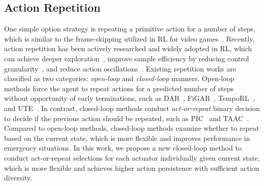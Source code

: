 \subsection{Action Repetition}
One simple option strategy is repeating a primitive action for a number of steps, which is similar to the frame-skipping utilized in RL for video games~\citep{bellemare2013arcade,braylan2015frame}.
Recently, action repetition has been actively researched and widely adopted in RL, which can achieve deeper exploration~\citep{dabney2021temporallyextended}, improve sample efficiency by reducing control granularity~\citep{biedenkapp2021temporl}, and reduce action oscillations~\citep{chen2021addressing}.
Existing repetition works are classified as two categories: \emph{open-loop} and \emph{closed-loop} manners.
Open-loop methods force the agent to repeat actions for a predicted number of steps without opportunity of early terminations, such as DAR~\citep{lakshminarayanan2017dynamic}, FiGAR~\citep{sharma2017learning}, TempoRL~\citep{biedenkapp2021temporl}, and UTE~\citep{lee2024learning}.
In contrast, closed-loop methods conduct \emph{act-or-repeat} binary decision to decide if the previous action should be repeated, such as PIC~\citep{chen2021addressing} and TAAC~\citep{yu2021taac}.
Compared to open-loop methods, closed-loop methods examine whether to repeat based on the current state, which is more flexible and improves performance in emergency situations.
In this work, we propose a new closed-loop method to conduct act-or-repeat selections for each actuator individually given current state, which is more flexible and achieves higher action persistence with sufficient action diversity.